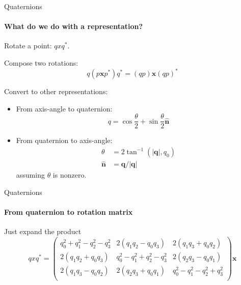 \documentclass[aspectratio=169]{beamer}
\begin{document}
\begin{frame}{Quaternions}
    \framesubtitle{What do we do with a representation?}
    Rotate a point:  $qxq^*$.

    Compose two rotations:
    \begin{equation}
        q(p\mathbf{x} p^*)q^* = (qp)\mathbf{x}(qp)^*
    \end{equation}

    Convert to other representations:
    \begin{itemize}
        \item  From axis-angle to quaternion:
        \begin{equation}
            q = \cos \frac{\theta}{2} + \sin \frac{\theta}{2} \hat{\mathbf{n}}
        \end{equation}

        \item  From quaternion to axis-angle:
        \begin{align*}
            \theta &= 2 \tan^{-1}(|{\mathbf{q}}|, q_0) \\
            \hat{\mathbf{n}} &= {\mathbf{q}}/|{\mathbf{q}}|
        \end{align*}
        assuming $\theta$ is nonzero. 
    \end{itemize}
\end{frame}


\begin{frame}{Quaternions}
    \framesubtitle{From quaternion to rotation matrix}

        Just expand the product
        \begin{equation}
        qxq^* = 
        \left( \begin{array}{ccc}
                q_0^2 + q_1^2 - q_2^2 - q_3^2 
                        & 2(q_1 q_2 - q_0 q_3) 
                        & 2(q_1 q_3 + q_0 q_2) \\
                2(q_1 q_2 + q_0 q_3) 
                        & q_0^2 - q_1^2 + q_2^2 - q_3^2 
                        & 2 (q_2 q_3 - q_0 q_1) \\
                2(q_1 q_3 - q_0 q_2) 
                        & 2 (q_2 q_3 + q_0 q_1)
                        & q_0^2 - q_1^2 - q_2^2 + q_3^2 \\
                        \end{array}\right) \mathbf{x}
        \end{equation}
\end{frame}
\end{document}
